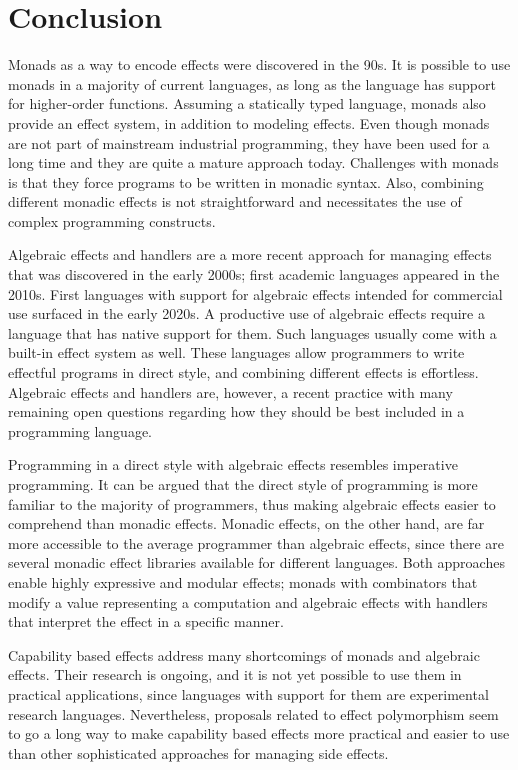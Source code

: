 \chapter{Conclusion}
Monads as a way to encode effects were discovered in the 90s. It is possible to use monads in a majority of current languages, as long as the language has support for higher-order functions. Assuming a statically typed language, monads also provide an effect system, in addition to modeling effects. Even though monads are not part of mainstream industrial programming, they have been used for a long time and they are quite a mature approach today. Challenges with monads is that they force programs to be written in monadic syntax. Also, combining different monadic effects is not straightforward and necessitates the use of complex programming constructs.

Algebraic effects and handlers are a more recent approach for managing effects that was discovered in the early 2000s; first academic languages appeared in the 2010s. First languages with support for algebraic effects intended for commercial use surfaced in the early 2020s. A productive use of algebraic effects require a language that has native support for them. Such languages usually come with a built-in effect system as well. These languages allow programmers to write effectful programs in direct style, and combining different effects is effortless. Algebraic effects and handlers are, however, a recent practice with many remaining open questions regarding how they should be best included in a programming language.

Programming in a direct style with algebraic effects resembles imperative programming. It can be argued that the direct style of programming is more familiar to the majority of programmers, thus making algebraic effects easier to comprehend than monadic effects. Monadic effects, on the other hand, are far more accessible to the average programmer than algebraic effects, since there are several monadic effect libraries available for different languages. Both approaches enable highly expressive and modular effects; monads with combinators that modify a value representing a computation and algebraic effects with handlers that interpret the effect in a specific manner.

Capability based effects address many shortcomings of monads and algebraic effects. Their research is ongoing, and it is not yet possible to use them in practical applications, since languages with support for them are experimental research languages. Nevertheless, proposals related to effect polymorphism seem to go a long way to make capability based effects more practical and easier to use than other sophisticated approaches for managing side effects.

